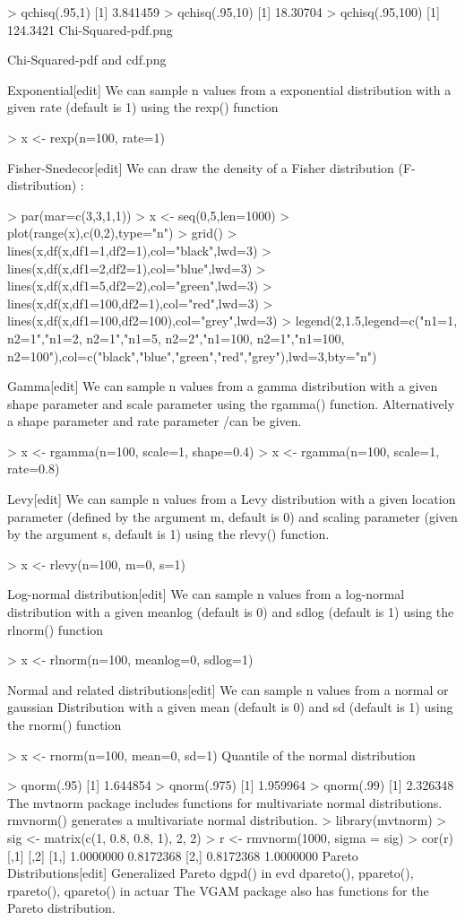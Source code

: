 \documentclass[12pt, a4paper]{article}
\theoremstyle{plain}
\theoremstyle{definition}
\theoremstyle{remark}
\begin{document}
> qchisq(.95,1)
[1] 3.841459
> qchisq(.95,10)
[1] 18.30704
> qchisq(.95,100)
[1] 124.3421
Chi-Squared-pdf.png
 
Chi-Squared-pdf and cdf.png


Exponential[edit]
We can sample n values from a exponential distribution with a given rate (default is 1) using the rexp() function

> x <- rexp(n=100, rate=1)


Fisher-Snedecor[edit]
We can draw the density of a Fisher distribution (F-distribution) :

> par(mar=c(3,3,1,1))
> x <- seq(0,5,len=1000)
> plot(range(x),c(0,2),type="n")
> grid()
> lines(x,df(x,df1=1,df2=1),col="black",lwd=3)
> lines(x,df(x,df1=2,df2=1),col="blue",lwd=3)
> lines(x,df(x,df1=5,df2=2),col="green",lwd=3)
> lines(x,df(x,df1=100,df2=1),col="red",lwd=3)
> lines(x,df(x,df1=100,df2=100),col="grey",lwd=3)
> legend(2,1.5,legend=c("n1=1, n2=1","n1=2, n2=1","n1=5, n2=2","n1=100, n2=1","n1=100, n2=100"),col=c("black","blue","green","red","grey"),lwd=3,bty="n")


Gamma[edit]
We can sample n values from a gamma distribution with a given shape parameter and scale parameter \theta using the rgamma() function. Alternatively a shape parameter and rate parameter /\theta can be given.

> x <- rgamma(n=100, scale=1, shape=0.4)
> x <- rgamma(n=100, scale=1, rate=0.8)


Levy[edit]
We can sample n values from a Levy distribution with a given location parameter \mu (defined by the argument m, default is 0) and scaling parameter (given by the argument s, default is 1) using the rlevy() function.

> x <- rlevy(n=100, m=0, s=1)


Log-normal distribution[edit]
We can sample n values from a log-normal distribution with a given meanlog (default is 0) and sdlog (default is 1) using the rlnorm() function

> x <- rlnorm(n=100, meanlog=0, sdlog=1)


Normal and related distributions[edit]
We can sample n values from a normal or gaussian Distribution with a given mean (default is 0) and sd (default is 1) using the rnorm() function

> x <- rnorm(n=100, mean=0, sd=1)
Quantile of the normal distribution

> qnorm(.95)
[1] 1.644854
> qnorm(.975)
[1] 1.959964
> qnorm(.99)
[1] 2.326348
The mvtnorm package includes functions for multivariate normal distributions.
rmvnorm() generates a multivariate normal distribution.
> library(mvtnorm)
> sig <- matrix(c(1, 0.8, 0.8, 1), 2, 2)
> r <- rmvnorm(1000, sigma = sig)
> cor(r) 
          [,1]      [,2]
[1,] 1.0000000 0.8172368
[2,] 0.8172368 1.0000000
Pareto Distributions[edit]
Generalized Pareto dgpd() in evd
dpareto(), ppareto(), rpareto(), qpareto() in actuar
The VGAM package also has functions for the Pareto distribution.
\end{document}
